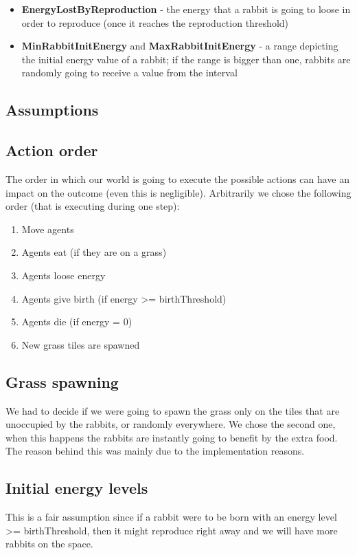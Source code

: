\documentclass[11pt]{article}
\begin{document}
\begin{itemize}
\item \textbf{EnergyLostByReproduction} - the energy that a rabbit is going to loose in order to reproduce (once it reaches the reproduction threshold)
\item \textbf{MinRabbitInitEnergy} and \textbf{MaxRabbitInitEnergy} - a range depicting the initial energy value of a rabbit; if the range is bigger than one, rabbits are randomly going to receive a value from the interval 
\end{itemize}






\subsection{Assumptions}

\subsection* {Action order}
The order in which our world is going to execute the possible actions can have an impact on the outcome (even this is negligible). Arbitrarily we chose the following order (that is executing during one step):
\begin{enumerate}
\item  Move agents
\item  Agents eat (if they are on a grass)
\item  Agents loose energy
\item  Agents give birth (if energy >= birthThreshold)
\item  Agents die (if energy = 0)
\item  New grass tiles are spawned
\end{enumerate}

\subsection* {Grass spawning}
We had to decide if we were going to spawn the grass only on the tiles that are unoccupied by the rabbits, or randomly everywhere. We chose the second one, when this happens the rabbits are instantly going to benefit by the extra food. The reason behind this was mainly due to the implementation reasons.

\subsection* {Initial energy levels}
This is a fair assumption since if a rabbit were to be born with an energy level >= birthThreshold, then it might reproduce right away and we will have more rabbits on the space.
\end{document}
